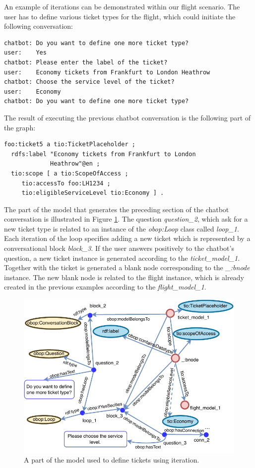 \documentclass[runningheads]{llncs}
\begin{document}
An example of iterations can be demonstrated within our flight scenario. The user has to define various ticket types for the flight, which could initiate the following conversation:
\begin{lstlisting}[basicstyle=\small,  xleftmargin=0.7cm ]
chatbot: Do you want to define one more ticket type?
user:    Yes
chatbot: Please enter the label of the ticket?
user:    Economy tickets from Frankfurt to London Heathrow
chatbot: Choose the service level of the ticket?
user:    Economy
chatbot: Do you want to define one more ticket type?
\end{lstlisting}
The result of executing the previous chatbot conversation is the following part of the graph:
\begin{lstlisting}[basicstyle=\small,  xleftmargin=0.7cm ]
foo:ticket5 a tio:TicketPlaceholder ;
  rdfs:label "Economy tickets from Frankfurt to London
             Heathrow"@en ;
  tio:scope [ a tio:ScopeOfAccess ;
     tio:accessTo foo:LH1234 ;
     tio:eligibleServiceLevel tio:Economy ] .
\end{lstlisting}
The part of the model that generates the preceding section of the chatbot conversation is illustrated in Figure \ref{fig:iteration_example}. The question \textit{question\_2}, which ask for a new ticket type is related to an instance of the \textit{obop:Loop} class called \textit{loop\_1}. Each iteration of the loop specifies adding a new ticket which is represented by a conversational block \textit{block\_3}. If the user answers positively to the chatbot's question, a new ticket instance is generated according to the \textit{ticket\_model\_1}. Together with the ticket is generated a blank node corresponding to the \textit{\_:bnode} instance. The new blank node is related to the flight instance, which is already created in the previous examples according to the \textit{flight\_model\_1}.
\begin{figure}[H]
  \centering
  \includegraphics[width=\linewidth]{img/iteration_example}
  \caption{A part of the model used to define tickets using iteration.}
  \label{fig:iteration_example}
\end{figure}
\end{document}
